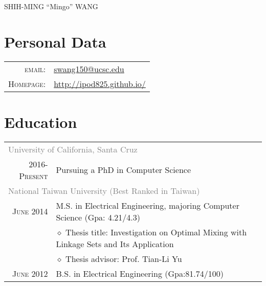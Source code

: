 \documentclass[a4paper,10pt]{article}
\begin{document}
\pagestyle{empty} %

\par{\centering
		{\Huge SHIH-MING ``Mingo'' WANG
	}\bigskip\par}

\section{Personal Data}

\begin{tabular}{rl}
    \textsc{email:}     & \href{mailto:swang150@ucsc.edu}{swang150@ucsc.edu}\\
\textsc{Homepage:} & \href{http://ipod825.github.io/}{http://ipod825.github.io/}
    
\end{tabular}

\section{Education}
\begin{tabular}{r|l}	
\multicolumn{2}{l}{\textcolor{gray}{University of California, Santa Cruz}}\\
\textsc{2016-Present}       & Pursuing a PhD in Computer Science\\
\multicolumn{2}{l}{\textcolor{gray}{National Taiwan University (Best Ranked in Taiwan)}}\\
\textsc{June 2014}          & M.S. in Electrical Engineering, majoring Computer Science (Gpa: 4.21/4.3)\\
                            & $\diamond$ Thesis title: Investigation on Optimal Mixing with Linkage Sets and Its Application\\
                            & $\diamond$ Thesis advisor: Prof. Tian-Li Yu\\
\textsc{June 2012}          & B.S. in Electrical Engineering (Gpa:81.74/100)\\       
\end{tabular}
\end{document}
